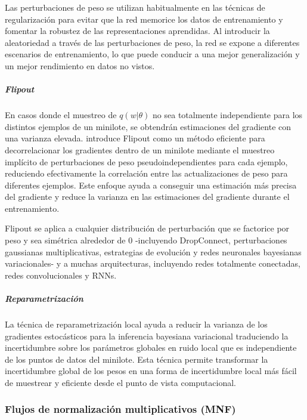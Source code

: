 \documentclass[10pt, oneside, a4paper]{article}
\begin{document}
	Las perturbaciones de peso se utilizan habitualmente en las técnicas de regularización para evitar que la red memorice los datos de entrenamiento y fomentar la robustez de las representaciones aprendidas. Al introducir la aleatoriedad a través de las perturbaciones de peso, la red se expone a diferentes escenarios de entrenamiento, lo que puede conducir a una mejor generalización y un mejor rendimiento en datos no vistos.
	
	\subparagraph{Flipout}
	
	En casos donde el muestreo de $q(w|\theta)$ no sea totalmente independiente para los distintos ejemplos de un minilote, se obtendrán estimaciones del gradiente con una varianza elevada. \cite{wen2018flipout} introduce Flipout como un método eficiente para decorrelacionar los gradientes dentro de un minilote mediante el muestreo implícito de perturbaciones de peso pseudoindependientes para cada ejemplo, reduciendo efectivamente la correlación entre las actualizaciones de peso para diferentes ejemplos. Este enfoque ayuda a conseguir una estimación más precisa del gradiente y reduce la varianza en las estimaciones del gradiente durante el entrenamiento.
	
	Flipout se aplica a cualquier distribución de perturbación que se factorice por peso y sea simétrica alrededor de 0 \cite{wen2018flipout, Hort_a_2023} -incluyendo DropConnect, perturbaciones gaussianas multiplicativas, estrategias de evolución y redes neuronales bayesianas variacionales- y a muchas arquitecturas, incluyendo redes totalmente conectadas, redes convolucionales y RNNs.

	\subparagraph{Reparametrización}
	
	La técnica de reparametrización local \cite{kingma2015variational} ayuda a reducir la varianza de los gradientes estocásticos para la inferencia bayesiana variacional traduciendo la incertidumbre sobre los parámetros globales en ruido local que es independiente de los puntos de datos del minilote. Esta técnica permite transformar la incertidumbre global de los pesos en una forma de incertidumbre local más fácil de muestrear y eficiente desde el punto de vista computacional. 

	\subsubsection{Flujos de normalización multiplicativos (MNF)}
\end{document}
